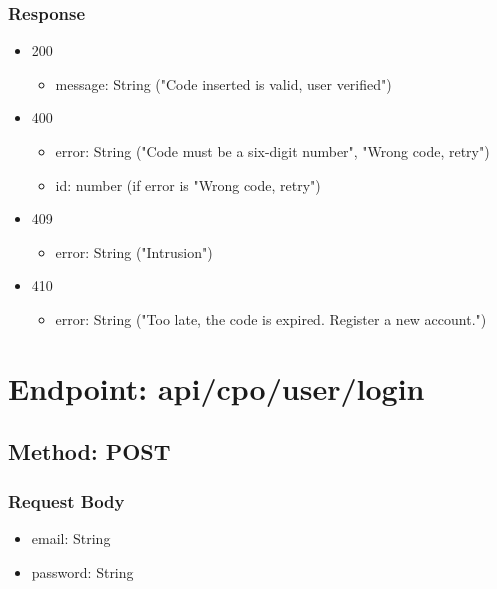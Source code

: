 \subsubsection*{Response}
\begin{itemize}
    \item 200
          \begin{itemize}
              \item message: String ("Code inserted is valid, user verified")
          \end{itemize}
    \item 400
          \begin{itemize}
              \item error: String ("Code must be a six-digit number", "Wrong code, retry")
              \item id: number (if error is "Wrong code, retry")
          \end{itemize}
    \item 409
          \begin{itemize}
              \item error: String ("Intrusion")
          \end{itemize}
    \item 410
          \begin{itemize}
              \item error: String ("Too late, the code is expired. Register a new account.")
          \end{itemize}
\end{itemize}

\section*{Endpoint: api/cpo/user/login}
\subsection*{Method: POST}
\subsubsection*{Request Body}
\begin{itemize}
    \item email: String
    \item password: String
\end{itemize}
